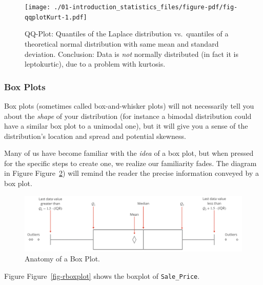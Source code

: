 \documentclass[
  letterpaper,
  DIV=11,
  numbers=noendperiod]{scrreprt}
\newenvironment{Shaded}{\begin{snugshade}}{\end{snugshade}}
\newcommand{\AttributeTok}[1]{\textcolor[rgb]{0.40,0.45,0.13}{#1}}
\newcommand{\DecValTok}[1]{\textcolor[rgb]{0.68,0.00,0.00}{#1}}
\newcommand{\FunctionTok}[1]{\textcolor[rgb]{0.28,0.35,0.67}{#1}}
\newcommand{\NormalTok}[1]{\textcolor[rgb]{0.00,0.23,0.31}{#1}}
\newcommand{\SpecialCharTok}[1]{\textcolor[rgb]{0.37,0.37,0.37}{#1}}
\newcommand{\StringTok}[1]{\textcolor[rgb]{0.13,0.47,0.30}{#1}}
\begin{document}
\begin{figure}[H]

{\centering \texttt{[image: ./01-introduction\_statistics\_files/figure-pdf/fig-qqplotKurt-1.pdf]}

}

\caption{\label{fig-qqplotKurt}QQ-Plot: Quantiles of the Laplace
distribution vs.~quantiles of a theoretical normal distribution with
same mean and standard deviation. Conclusion: Data is \emph{not}
normally distributed (in fact it is leptokurtic), due to a problem with
kurtosis.}

\end{figure}

\hypertarget{box-plots}{%
\subsubsection*{Box Plots}\label{box-plots}}

Box plots (sometimes called box-and-whisker plots) will not necessarily
tell you about the \emph{shape} of your distribution (for instance a
bimodal distribution could have a similar box plot to a unimodal one),
but it will give you a sense of the distribution's location and spread
and potential skewness.

Many of us have become familiar with the \emph{idea} of a box plot, but
when pressed for the specific steps to create one, we realize our
familiarity fades. The diagram in Figure Figure~\ref{fig-boxplot}) will
remind the reader the precise information conveyed by a box plot.

\begin{figure}

{\centering \includegraphics{./img/boxplot.png}

}

\caption{\label{fig-boxplot}Anatomy of a Box Plot.}

\end{figure}

Figure Figure~\ref{fig-rboxplot} shows the boxplot of
\texttt{Sale\_Price}.

\begin{Shaded}
\end{Shaded}
\end{document}
